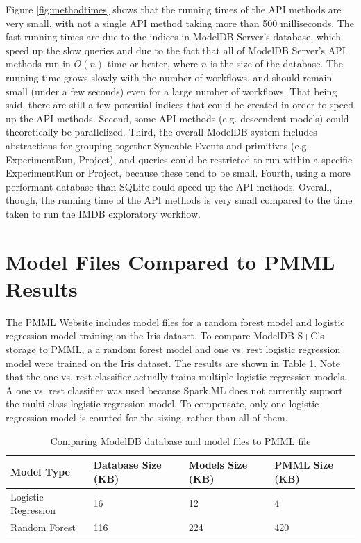 Figure \ref{fig:methodtimes} shows that the running times of the API methods are
very small, with not a single API method taking more than 500 milliseconds. The fast running
times are due to the indices in ModelDB Server's database, which speed up the slow queries
and due to the fact that all of ModelDB Server's API methods run in $O(n)$ time or better, where
$n$ is the size of the database. The running time grows slowly with the number of workflows, and
should remain small (under a few seconds) even for a large number of workflows. That being said, there are still
a few potential indices that could be created in order to speed up the API methods. Second, some API
methods (e.g. descendent models) could theoretically be parallelized. Third, the overall ModelDB system includes
abstractions for grouping together Syncable Events and primitives (e.g. ExperimentRun, Project), and queries could be
restricted to run within a specific ExperimentRun or Project, because these tend to be small. Fourth,
using a more performant database than SQLite could speed up the API methods. Overall, though, the running
time of the API methods is very small compared to the time taken to run the IMDB exploratory workflow.

\section{Model Files Compared to PMML Results}
The PMML Website includes model files for a random forest model and logistic regression
model training on the Iris dataset. To compare ModelDB S+C's storage to PMML, a
a random forest model and one vs. rest logistic regression model were trained on the Iris
dataset. The results are shown in Table \ref{tab:pmml}. Note that the one vs. rest classifier
actually trains multiple logistic regression models. A one vs. rest classifier was used
because Spark.ML does not currently support the multi-class logistic regression model. To
compensate, only one logistic regression model is counted for the sizing, rather than
all of them.

 \begin{table}
   \centering
    \begin{tabular}{ | l | l | l | l |}
      \hline
      Model Type & Database Size (KB) & Models Size (KB) & PMML Size (KB) \\ \hline
      Logistic Regression & 16 & 12 & 4 \\ \hline
      Random Forest & 116 & 224 & 420 \\ 
      \hline
   \end{tabular}
   \caption{Comparing ModelDB database and model files to PMML file}
   \label{tab:pmml}
 \end{table}

